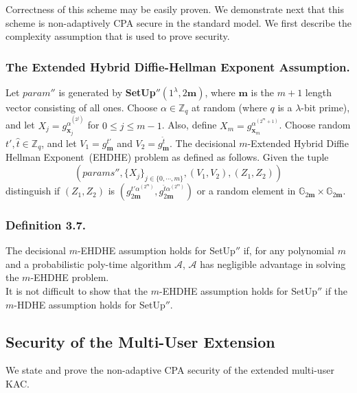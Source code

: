 \noindent Correctness of this scheme may be easily proven. We demonstrate next that this scheme is non-adaptively CPA secure in the standard model. We first describe the complexity assumption that is used to prove security. 

\subsubsection{The Extended Hybrid Diffie-Hellman Exponent Assumption.} Let $param''$ is generated by \textbf{SetUp}$''(1^{\lambda},2\mathbf{m})$, where $\mathbf{m}$ is the $m+1$ length vector consisting of all ones. Choose $\alpha \in \mathbb{Z}_q$ at random (where $q$ is a $\lambda$-bit prime), and let $X_j=g^{\alpha^{(2^j)}}_{\mathbf{x}_j}$ for $0\leq j \leq m-1$. Also, define $X_m=g^{\alpha^{(2^m+1)}}_{\mathbf{x}_m}$. Choose random $t',\hat{t}\in\mathbb{Z}_q$, and let $V_1=g^{t'}_{\mathbf{m}}$ and $V_2=g^{\hat{t}}_{\mathbf{m}}$. The decisional $m$-Extended Hybrid Diffie Hellman Exponent~(EHDHE) problem as defined as follows. Given the tuple
\begin{equation}
\left(params'',\{X_j\}_{j\in\{0,\cdots,m\}},(V_1,V_2),(Z_1,Z_2)\right)\nonumber
\end{equation}
\noindent distinguish if $(Z_1,Z_2)$ is $\left(g^{t'\alpha^{(2^m)}}_{2\mathbf{m}},g^{\hat{t}\alpha^{(2^m)}}_{2\mathbf{m}}\right)$ or a random element in $\mathbb{G}_{2\mathbf{m}}\times\mathbb{G}_{2\mathbf{m}}$.\\

\subsubsection{Definition 3.7.} The decisional $m$-EHDHE assumption holds for {SetUp}$''$ if, for any polynomial $m$ and a probabilistic poly-time algorithm $\mathcal{A}$, $\mathcal{A}$ has negligible advantage in solving the $m$-EHDHE problem.\\

It is not difficult to show that the $m$-EHDHE assumption holds for {SetUp}$''$ if the $m$-HDHE assumption holds for {SetUp}$''$.


\subsection{Security of the Multi-User Extension}
\label{subsec:security1_1}

We state and prove the non-adaptive CPA security of the extended multi-user KAC.

